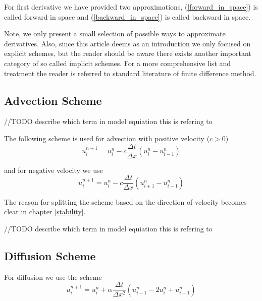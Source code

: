 \documentclass[]{article}
\begin{document}
For first derivative we have provided two approximations, (\ref{forward_in_space}) is called
forward in space and (\ref{backward_in_space}) is called backward in space.

Note, we only present a small selection of possible ways to approximate derivatives. Also, since this article deems as an introduction we only focused on explicit schemes, but the reader should be aware there exists another important category of so called implicit schemes.
For a more comprehensive list and treatment the reader is referred to standard literature of finite difference method.

\subsection{Advection Scheme}
//TODO describe which term in model equiation this is refering to

The following scheme is used for advection with positive velocity ($c>0$)
\begin{equation} \label{advection_scheme_upwind}
u_{i}^{n+1}=u_{i}^{n}-c\frac{\Delta t}{\Delta x} (u_{i}^{n}-u_{i-1}^{n})
\end{equation}

and for negative velocity we use
\begin{equation} \label{advection_scheme_downwind}
u_{i}^{n+1}=u_{i}^{n}-c\frac{\Delta t}{\Delta x} (u_{i+1}^{n}-u_{i-1}^{n})
\end{equation}

The reason for splitting the scheme based on the direction of velocity becomes clear in chapter \ref{stability}.

//TODO describe which term in model equiation this is refering to

\subsection{Diffusion Scheme}
For diffusion we use the scheme
\begin{equation} \label{diffusion_scheme}
u_{i}^{n+1}=u_{i}^ {n}+\alpha\frac{\Delta t}{\Delta x^{2}} (u_{i-1}^{n}-2u_{i}^{n}+u_{i+1}^{n})
\end{equation}
\end{document}
